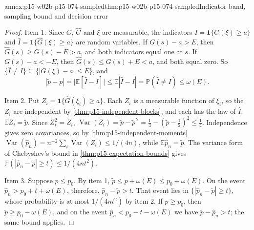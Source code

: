 \begin{annexitem}{annex:p15-w02b-p15-074-sampled}{thm:p15-w02b-p15-074-sampled}{Indicator band, sampling bound and decision error}
\begin{proof}
Item 1. Since \(G\), \(\widehat G\) and \(\xi\) are measurable, the
indicators \(I=\mathbf 1\{G(\xi)\geq a\}\) and
\(\widehat I=\mathbf 1\{\widehat G(\xi)\geq a\}\) are random variables.
If \(G(s)-a>E\), then \(\widehat G(s)\geq G(s)-E>a\), and both indicators
equal one at \(s\). If \(G(s)-a<-E\), then \(\widehat G(s)\leq G(s)+E<a\),
and both equal zero. So \(\{\widehat I\neq I\}\subseteq
\{|G(\xi)-a|\leq E\}\), and
\[
 |\widetilde p-p|=\bigl|\mathbb E[\widehat I-I]\bigr|
 \leq\mathbb E|\widehat I-I|=\mathbb P(\widehat I\neq I)\leq\omega(E).
\]

Item 2. Put \(Z_i=\mathbf 1\{\widehat G(\xi_i)\geq a\}\). Each \(Z_i\) is
a measurable function of \(\xi_i\), so the \(Z_i\) are independent by
\cref{thm:p15-independent-blocks}, and each has the law of \(\widehat I\):
\(\mathbb E Z_i=\widetilde p\). Since \(Z_i^2=Z_i\),
\(\operatorname{Var}(Z_i)=\widetilde p-\widetilde p^{\,2}
=\tfrac14-(\widetilde p-\tfrac12)^2\leq\tfrac14\). Independence gives zero
covariances, so by \cref{thm:p15-independent-moments}
\(\operatorname{Var}(\widehat p_n)=n^{-2}\sum_i\operatorname{Var}(Z_i)
\leq1/(4n)\), while \(\mathbb E\widehat p_n=\widetilde p\). The variance
form of Chebyshev's bound in \cref{thm:p15-expectation-bounds} gives
\(\mathbb P(|\widehat p_n-\widetilde p|\geq t)\leq1/(4nt^2)\).

Item 3. Suppose \(p\leq p_0\). By item 1,
\(\widetilde p\leq p+\omega(E)\leq p_0+\omega(E)\). On the event
\(\widehat p_n>p_0+t+\omega(E)\), therefore,
\(\widehat p_n-\widetilde p>t\). That event lies in
\(\{|\widehat p_n-\widetilde p|\geq t\}\), whose probability is at most
\(1/(4nt^2)\) by item 2. If \(p\geq p_0\), then
\(\widetilde p\geq p_0-\omega(E)\), and on the event
\(\widehat p_n<p_0-t-\omega(E)\) we have \(\widetilde p-\widehat p_n>t\);
the same bound applies.
\end{proof}
\end{annexitem}

